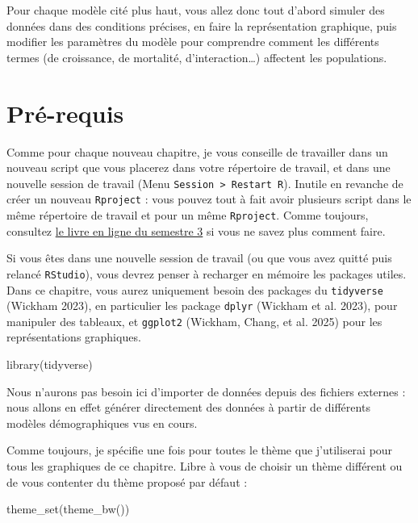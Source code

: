 \documentclass[
  french,
  a4paper,
  DIV=11,
  numbers=noendperiod,
  oneside]{scrreprt}
\newenvironment{Shaded}{}{}
\newcommand{\FunctionTok}[1]{\textcolor[rgb]{0.44,0.26,0.76}{#1}}
\newcommand{\NormalTok}[1]{\textcolor[rgb]{0.14,0.16,0.18}{#1}}
\begin{document}
\begin{tcolorbox}
Pour chaque modèle cité plus haut, vous allez donc tout d'abord simuler
des données dans des conditions précises, en faire la représentation
graphique, puis modifier les paramètres du modèle pour comprendre
comment les différents termes (de croissance, de mortalité,
d'interaction\ldots) affectent les populations.

\section{Pré-requis}\label{sec-packages5}

Comme pour chaque nouveau chapitre, je vous conseille de travailler dans
un nouveau script que vous placerez dans votre répertoire de travail, et
dans une nouvelle session de travail (Menu
\texttt{Session\ \textgreater{}\ Restart\ R}). Inutile en revanche de
créer un nouveau \texttt{Rproject} : vous pouvez tout à fait avoir
plusieurs script dans le même répertoire de travail et pour un même
\texttt{Rproject}. Comme toujours, consultez
\href{https://besibo.github.io/BiometrieS3/01-R-basics.html\#sec-code}{le
livre en ligne du semestre 3} si vous ne savez plus comment faire.

Si vous êtes dans une nouvelle session de travail (ou que vous avez
quitté puis relancé \texttt{RStudio}), vous devrez penser à recharger en
mémoire les packages utiles. Dans ce chapitre, vous aurez uniquement
besoin des packages du \texttt{tidyverse} (Wickham 2023), en particulier
les package \texttt{dplyr} (Wickham et al. 2023), pour manipuler des
tableaux, et \texttt{ggplot2} ({Wickham, Chang, et al.} 2025) pour les
représentations graphiques.

\begin{Shaded}
\begin{Highlighting}[]
\FunctionTok{library}\NormalTok{(tidyverse)}
\end{Highlighting}
\end{Shaded}

Nous n'aurons pas besoin ici d'importer de données depuis des fichiers
externes : nous allons en effet générer directement des données à partir
de différents modèles démographiques vus en cours.

Comme toujours, je spécifie une fois pour toutes le thème que
j'utiliserai pour tous les graphiques de ce chapitre. Libre à vous de
choisir un thème différent ou de vous contenter du thème proposé par
défaut :

\begin{Shaded}
\begin{Highlighting}[]
\FunctionTok{theme\_set}\NormalTok{(}\FunctionTok{theme\_bw}\NormalTok{())}
\end{Highlighting}
\end{Shaded}


\end{tcolorbox}
\end{document}
